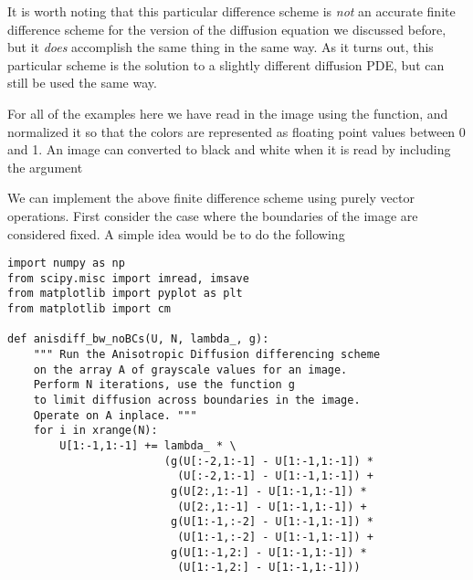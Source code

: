 It is worth noting that this particular difference scheme is \textit{not} an accurate finite difference scheme for the version of the diffusion equation we discussed before, but it \textit{does} accomplish the same thing in the same way.
As it turns out, this particular scheme is the solution to a slightly different diffusion PDE, but can still be used the same way.

For all of the examples here we have read in the image using the  function, and normalized it so that the colors are represented as floating point values between 0 and 1.
An image can converted to black and white when it is read by including the argument 

We can implement the above finite difference scheme using purely vector operations.
First consider the case where the boundaries of the image are considered fixed.
A simple idea would be to do the following
\begin{lstlisting}
import numpy as np
from scipy.misc import imread, imsave
from matplotlib import pyplot as plt
from matplotlib import cm

def anisdiff_bw_noBCs(U, N, lambda_, g):
    """ Run the Anisotropic Diffusion differencing scheme
    on the array A of grayscale values for an image.
    Perform N iterations, use the function g
    to limit diffusion across boundaries in the image.
    Operate on A inplace. """
    for i in xrange(N):
        U[1:-1,1:-1] += lambda_ * \
                        (g(U[:-2,1:-1] - U[1:-1,1:-1]) *
                          (U[:-2,1:-1] - U[1:-1,1:-1]) +
                         g(U[2:,1:-1] - U[1:-1,1:-1]) *
                          (U[2:,1:-1] - U[1:-1,1:-1]) +
                         g(U[1:-1,:-2] - U[1:-1,1:-1]) *
                          (U[1:-1,:-2] - U[1:-1,1:-1]) +
                         g(U[1:-1,2:] - U[1:-1,1:-1]) *
                          (U[1:-1,2:] - U[1:-1,1:-1]))
\end{lstlisting}

